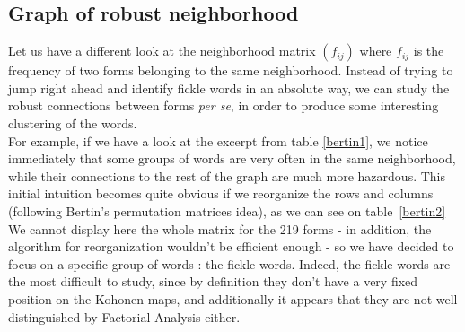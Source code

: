 \documentclass{elsarticle}
\begin{document}
\subsection{Graph of robust neighborhood}

Let us have a different look at the neighborhood matrix $(f_{ij})$ where $f_{ij}$ is the frequency of two forms belonging to the same neighborhood. Instead of trying to jump right ahead and identify fickle words in an absolute way, we can study the robust connections between forms \textit{per se}, in order to produce some interesting clustering of the words.\\

For example, if we have a look at the excerpt from table \ref{bertin1}, we notice immediately that some groups of words are very often in the same neighborhood, while their connections to the rest of the graph are much more hazardous. This initial intuition becomes quite obvious if we reorganize the rows and columns (following Bertin's permutation matrices idea), as we can see on table~\ref{bertin2}\\

We cannot display here the whole matrix for the 219 forms - in addition, the algorithm for reorganization wouldn't be efficient enough - so we have decided to focus on a specific group of words : the fickle words. Indeed, the fickle words are the most difficult to study, since by definition they don't have a very fixed position on the Kohonen maps, and additionally it appears that they are not well distinguished by Factorial Analysis either.
\end{document}
